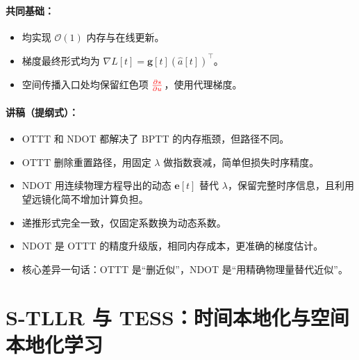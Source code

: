 \documentclass[journal,12pt,onecolumn]{IEEEtran}
\begin{document}
\paragraph{\textbf{共同基础：}}
\begin{itemize}
    \item 均实现 \(\mathcal{O}(1)\) 内存与在线更新。
    \item 梯度最终形式均为 \(\nabla L[t] = \mathbf{g}[t](\hat{a}[t])^\top\)。
    \item 空间传播入口处均保留红色项 \({\color{red}{\frac{\partial s}{\partial u}}}\)，使用代理梯度。
\end{itemize}

\paragraph{\textbf{讲稿（提纲式）：}}
\begin{itemize}
    \item OTTT 和 NDOT 都解决了 BPTT 的内存瓶颈，但路径不同。
    \item OTTT 删除重置路径，用固定 \(\lambda\) 做指数衰减，简单但损失时序精度。
    \item NDOT 用连续物理方程导出的动态 \(\mathbf{e}[t]\) 替代 \(\lambda\)，保留完整时序信息，且利用望远镜化简不增加计算负担。
    \item 递推形式完全一致，仅固定系数换为动态系数。
    \item NDOT 是 OTTT 的精度升级版，相同内存成本，更准确的梯度估计。
    \item 核心差异一句话：OTTT 是“删近似”，NDOT 是“用精确物理量替代近似”。
\end{itemize}




\section{S-TLLR 与 TESS：时间本地化与空间本地化学习}




\end{document}
